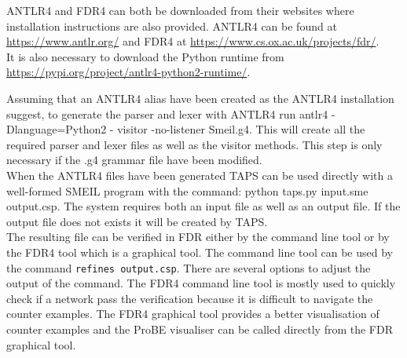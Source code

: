 ANTLR4 and FDR4 can both be downloaded from their websites where installation instructions are also provided.
ANTLR4 can be found at \url{https://www.antlr.org/} and FDR4 at \url{https://www.cs.ox.ac.uk/projects/fdr/}.\\
It is also necessary to download the Python runtime from \url{https://pypi.org/project/antlr4-python2-runtime/}.

Assuming that an ANTLR4 alias have been created as the ANTLR4 installation suggest, to generate the parser and lexer with ANTLR4 run {\ttfamily antlr4 -Dlanguage=Python2 - visitor -no-listener Smeil.g4.}
This will create all the required parser and lexer files as well as the visitor methods. This step is only necessary if the .g4 grammar file have been modified.\\

When the ANTLR4 files have been generated TAPS can be used directly with a well-formed SMEIL program with the command: {\ttfamily python taps.py input.sme output.csp}. The system requires both an input file as well as an output file. If the output file does not exists it will be created by TAPS. \\

The resulting \cspm{} file can be verified in FDR either by the command line tool or by the FDR4 tool which is a graphical tool. The command line tool can be used by the command \texttt{refines output.csp}. There are several options to adjust the output of the command. The FDR4 command line tool is mostly used to quickly check if a network pass the verification because it is difficult to navigate the counter examples. The FDR4 graphical tool provides a better visualisation of counter examples and the ProBE visualiser can be called directly from the FDR graphical tool.

